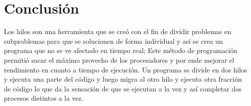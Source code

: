 \documentclass[11pt]{article}
\begin{document}
\section{Conclusión}
Los hilos son una herramienta que se creó con el fin de dividir problemas en subproblemas para que se solucionen de forma individual y así se crea un programa que no se ve afectado en tiempo real; Este método de programación permitió sacar el máximo provecho de los procesadores y por ende mejorar el rendimiento en cuanto a tiempo de ejecución. Un programa se divide en dos hilos y ejecuta una parte del código y luego migra al otro hilo y ejecuta otra fracción de código lo que da la sensación de que se ejecutan a la vez y así completar dos procesos distintos a la vez.




\end{document}
